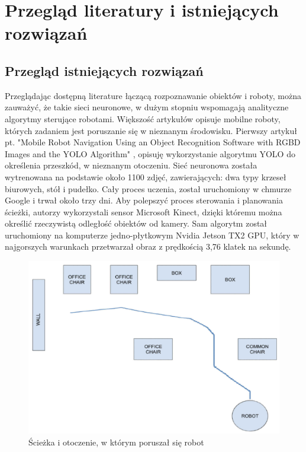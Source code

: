 \section{Przegląd literatury i istniejących rozwiązań}
\subsection{Przegląd istniejących rozwiązań}
Przeglądając dostępną literature łączącą rozpoznawanie obiektów i roboty,  
można zauważyć, że takie sieci neuronowe, w dużym stopniu wspomagają analityczne algorytmy sterujące robotami. Większość artykułów opisuje mobilne roboty, których zadaniem jest poruszanie się w nieznanym środowisku. 
Pierwszy artykuł pt. "Mobile Robot Navigation Using an Object Recognition Software with RGBD Images and the YOLO Algorithm"  \cite{yoloAndMobileRobot}, opisuję wykorzystanie algorytmu YOLO do określenia przeszkód, w nieznanym otoczeniu.
Sieć neuronowa została wytrenowana na podstawie około 1100 zdjęć, zawierających: dwa typy krzeseł biurowych, stół i pudełko. Cały proces uczenia, został uruchomiony w chmurze Google i trwał około trzy dni. Aby polepszyć proces sterowania i planowania ścieżki, autorzy wykorzystali sensor Microsoft Kinect, dzięki któremu można określić rzeczywistą odległość obiektów od kamery.
Sam algorytm został uruchomiony na komputerze jedno-płytkowym Nvidia Jetson TX2 GPU, który w najgorszych warunkach przetwarzał obraz z prędkością 3,76 klatek na sekundę.

\begin{figure}[H]
	\centering
	\includegraphics[width=14cm]{pages/OpisRozwiazania/img/wynikPracyArtYOLO.png}
	\caption{Ścieżka i otoczenie, w którym poruszał się robot\cite{yoloAndMobileRobot}}
	\label{rys:sciezkaRobota}
\end{figure}

